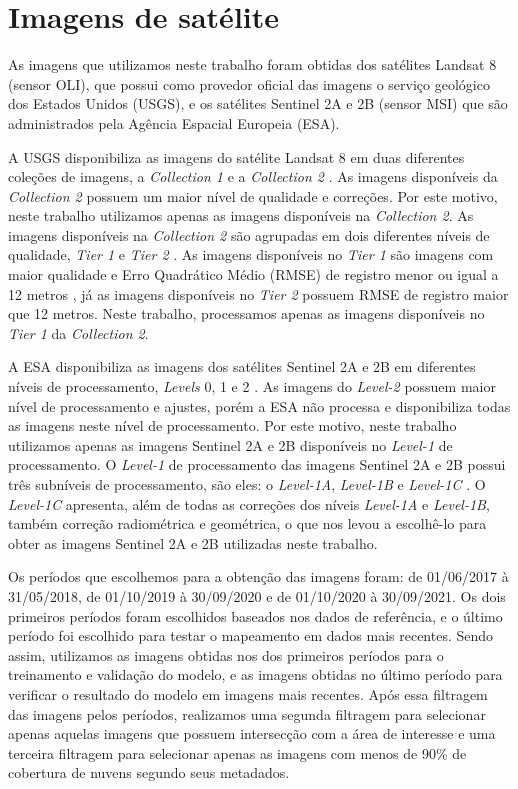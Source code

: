 \section{Imagens de satélite}

As imagens que utilizamos neste trabalho foram obtidas dos satélites Landsat 8 (sensor OLI), que possui como provedor oficial das imagens o serviço geológico dos Estados Unidos (USGS), e os satélites Sentinel 2A e 2B (sensor MSI) que são administrados pela Agência Espacial Europeia (ESA). 

A USGS disponibiliza as imagens do satélite Landsat 8 em duas diferentes coleções de imagens, a \textit{Collection 1} e a \textit{Collection 2} \cite{eros2017landsat}. As imagens disponíveis da \textit{Collection 2} possuem um maior nível de qualidade e correções. Por este motivo, neste trabalho utilizamos apenas as imagens disponíveis na \textit{Collection 2}. As imagens disponíveis na \textit{Collection 2} são agrupadas em dois diferentes níveis de qualidade, \textit{Tier 1} e \textit{Tier 2}  \cite{eros2017landsat}. As imagens disponíveis no \textit{Tier 1} são imagens com maior qualidade e Erro Quadrático Médio (RMSE) de registro menor ou igual a 12 metros \cite{eros2017landsat}, já as imagens disponíveis no \textit{Tier 2} possuem RMSE de registro maior que 12 metros. Neste trabalho, processamos apenas as imagens disponíveis no \textit{Tier 1} da \textit{Collection 2}.

A ESA disponibiliza as imagens dos satélites Sentinel 2A e 2B em diferentes níveis de processamento, \textit{Levels} 0, 1 e 2 \cite{sentinel2user}. As imagens do \textit{Level-2} possuem maior nível de processamento e ajustes, porém a ESA não processa e disponibiliza todas as imagens neste nível de processamento. Por este motivo, neste trabalho utilizamos apenas as imagens Sentinel 2A e 2B disponíveis no \textit{Level-1} de processamento. O \textit{Level-1} de processamento das imagens Sentinel 2A e 2B possui três subníveis de processamento, são eles: o \textit{Level-1A}, \textit{Level-1B} e \textit{Level-1C} \cite{sentinel2user}. O \textit{Level-1C} apresenta, além de todas as correções dos níveis \textit{Level-1A} e \textit{Level-1B}, também correção radiométrica e geométrica, o que nos levou a escolhê-lo para obter as imagens Sentinel 2A e 2B utilizadas neste trabalho.    

Os períodos que escolhemos para a obtenção das imagens foram: de 01/06/2017 à 31/05/2018, de 01/10/2019 à 30/09/2020 e de 01/10/2020 à 30/09/2021. Os dois primeiros períodos foram escolhidos baseados nos dados de referência, e o último período foi escolhido para testar o mapeamento em dados mais recentes. Sendo assim, utilizamos as imagens obtidas nos dos primeiros períodos para o treinamento e validação do modelo, e as imagens obtidas no último período para verificar o resultado do modelo em imagens mais recentes. Após essa filtragem das imagens pelos períodos, realizamos uma segunda filtragem para selecionar apenas aquelas imagens que possuem intersecção com a área de interesse e uma terceira filtragem para selecionar apenas as imagens com menos de 90\% de cobertura de nuvens segundo seus metadados.

